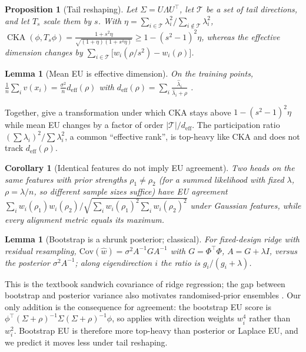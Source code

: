 \documentclass[twoside]{article}
\newtheorem{proposition}[theorem]{Proposition}
\newtheorem{lemma}[theorem]{Lemma}
\newtheorem{corollary}[theorem]{Corollary}
\theoremstyle{definition}
\theoremstyle{remark}
\newcommand{\cka}{\operatorname{CKA}}
\newcommand{\deff}{d_{\mathrm{eff}}}
\begin{document}
\begin{proposition}[Tail reshaping]
\label{prop:tail}
Let $\Sigma=U\Lambda U^\top$, let $\mathcal T$ be a set of tail directions, and let $T_s$ scale them by $s$.
With $\eta=\sum_{i\in\mathcal T}\lambda_i^2/\sum_{i\notin\mathcal T}\lambda_i^2$,
$\cka(\phi,T_s\phi)=\frac{1+s^2\eta}{\sqrt{(1+\eta)(1+s^4\eta)}}\ge 1-(s^2-1)^2\eta$,
whereas the effective dimension changes by $\sum_{i\in\mathcal T}\big[w_i(\rho/s^2)-w_i(\rho)\big]$.
\end{proposition}

\begin{lemma}[Mean EU is effective dimension]
\label{lem:deff}
On the training points, $\frac1n\sum_{i}v(x_i)=\frac{\sigma^2}{n}\deff(\rho)$ with $\deff(\rho)=\sum_i\frac{\hat\lambda_i}{\hat\lambda_i+\rho}$ \citep{zhang2005effective,caponnetto2007optimal}.
\end{lemma}

Together,  give a transformation under which CKA stays above $1-(s^2-1)^2\eta$ while mean EU changes by a factor of order $|\mathcal T|/\deff$.
The participation ratio $(\sum\lambda_i)^2/\sum\lambda_i^2$, a common ``effective rank'', is top-heavy like CKA and does not track $\deff(\rho)$.

\begin{corollary}[Identical features do not imply EU agreement]
\label{cor:same}
Two heads on the \emph{same} features with prior strengths $\rho_1\ne\rho_2$ (for a summed likelihood with fixed $\lambda$, $\rho=\lambda/n$, so different sample sizes suffice) have EU agreement $\sum_iw_i(\rho_1)w_i(\rho_2)/\sqrt{\sum_iw_i(\rho_1)^2\sum_iw_i(\rho_2)^2}$ under Gaussian features, while every alignment metric equals its maximum.
\end{corollary}

\begin{lemma}[Bootstrap is a shrunk posterior; classical]
\label{lem:boot}
For fixed-design ridge with residual resampling, $\mathrm{Cov}(\hat w)=\sigma^2A^{-1}GA^{-1}$ with $G=\Phi^\top\Phi$, $A=G+\lambda I$, versus the posterior $\sigma^2A^{-1}$; along eigendirection $i$ the ratio is $g_i/(g_i+\lambda)$.
\end{lemma}

This is the textbook sandwich covariance of ridge regression; the gap between bootstrap and posterior variance also motivates randomised-prior ensembles \citep{osband2018randomized}. Our only addition is the consequence for agreement: the bootstrap EU score is $\phi^\top(\Sigma+\rho)^{-1}\Sigma(\Sigma+\rho)^{-1}\phi$, so  applies with direction weights $w_i^4$ rather than $w_i^2$.
Bootstrap EU is therefore more top-heavy than posterior or Laplace EU, and we predict it moves less under tail reshaping.
\end{document}
